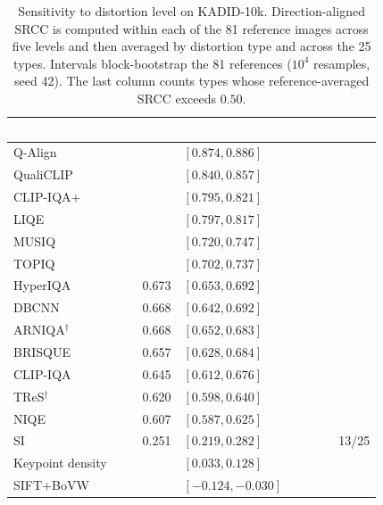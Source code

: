 \documentclass[sn-basic,Numbered]{sn-jnl}
\newcommand{\pfA}[1]{\cellcolor{perf5}\textcolor{white}{\textbf{#1}}}
\newcommand{\pfB}[1]{\cellcolor{perf4}#1}
\newcommand{\pfD}[1]{\cellcolor{perf2}#1}
\newcommand{\pfE}[1]{\cellcolor{perf1}\textcolor{white}{#1}}
\newcommand{\hd}[1]{\textcolor{white}{\textbf{#1}}}
\begin{document}
\begin{table}[!ht]
\centering
\caption{Sensitivity to distortion level on KADID-10k. Direction-aligned SRCC is
computed within each of the 81 reference images across five levels and then
averaged by distortion type and across the 25 types. Intervals block-bootstrap
the 81 references ($10^4$ resamples, seed 42). The last column counts types whose
reference-averaged SRCC exceeds $0.50$.}
\label{tab:sensitivity}
\small
\setlength{\tabcolsep}{6pt}
\renewcommand{\arraystretch}{1.14}
\begin{tabular}{@{}l r l r@{}}
\toprule
\rowcolor{headerblue}
\hd{Method} & \hd{Mean $\rho^{\ast}$} & \hd{$95\%$ block CI} & \hd{Types $>0.5$} \\
\midrule
\rowcolor{rowlight} Q-Align   & \pfA{0.880} & $[0.874,0.886]$ & \pfA{23/25} \\
\rowcolor{rowwhite} QualiCLIP & \pfA{0.849} & $[0.840,0.857]$ & \pfA{22/25} \\
\rowcolor{rowlight} CLIP-IQA$+$ & \pfA{0.808} & $[0.795,0.821]$ & \pfA{22/25} \\
\rowcolor{rowwhite} LIQE      & \pfA{0.807} & $[0.797,0.817]$ & \pfA{22/25} \\
\rowcolor{rowlight} MUSIQ     & \pfA{0.733} & $[0.720,0.747]$ & \pfA{20/25} \\
\rowcolor{rowwhite} TOPIQ     & \pfA{0.721} & $[0.702,0.737]$ & \pfA{20/25} \\
\rowcolor{rowlight} HyperIQA  & \pfB{0.673} & $[0.653,0.692]$ & \pfA{19/25} \\
\rowcolor{rowwhite} DBCNN     & \pfB{0.668} & $[0.642,0.692]$ & \pfA{19/25} \\
\rowcolor{rowlight} ARNIQA$^{\dagger}$ & \pfB{0.668} & $[0.652,0.683]$ & \pfA{20/25} \\
\rowcolor{rowwhite} BRISQUE   & \pfB{0.657} & $[0.628,0.684]$ & \pfA{19/25} \\
\rowcolor{rowlight} CLIP-IQA  & \pfB{0.645} & $[0.612,0.676]$ & \pfA{20/25} \\
\rowcolor{rowwhite} TReS$^{\dagger}$ & \pfB{0.620} & $[0.598,0.640]$ & \pfA{18/25} \\
\rowcolor{rowlight} NIQE      & \pfB{0.607} & $[0.587,0.625]$ & \pfA{19/25} \\
\midrule
\rowcolor{rowwhite} SI              & \pfD{0.251} & $[0.219,0.282]$ & \pfD{13/25} \\
\rowcolor{focoauditado!12} Keypoint density & \pfE{0.079} & $[0.033,0.128]$ & \pfE{\ \,7/25} \\
\rowcolor{focoauditado!12} SIFT+BoVW       & \pfE{$-0.077$} & $[-0.124,-0.030]$ & \pfE{\ \,5/25} \\

\end{tabular}
\end{table}
\end{document}
